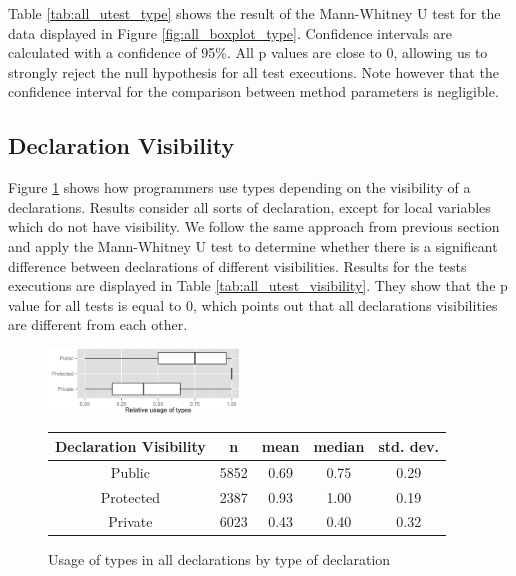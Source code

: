 \documentclass[preprint]{sigplanconf}
\renewcommand{\arraystretch}{1.2}
\begin{document}
Table \ref{tab:all_utest_type} shows the result of the Mann-Whitney U test for the data displayed in Figure \ref{fig:all_boxplot_type}.
Confidence intervals are calculated with a confidence of 95\%.
All p values are close to 0, allowing us to strongly reject the null hypothesis for all test executions.
Note however that the confidence interval for the comparison between method parameters is negligible.


\subsection{Declaration Visibility\label{sub:res_all_visibility}}
Figure \ref{fig:all_boxplot_visibility_all} shows how programmers use types depending on the visibility of a declarations.
Results consider all sorts of declaration, except for local variables which do not have visibility. 
We follow the same approach from previous section and apply the Mann-Whitney U test to determine whether there is a significant difference between declarations of different visibilities.
Results for the tests executions are displayed in Table \ref{tab:all_utest_visibility}.
They show that the p value for all tests is equal to 0, which points out that all declarations visibilities are different from each other.

\begin{figure}[h]
\centering 
\includegraphics[width=0.45\textwidth]{../analysis/result/all/boxplots/23_declarations_by_visibility.png} 
\label{fig:all_boxplot_visibility_all} 

\vspace{0.3cm}

\renewcommand{\arraystretch}{1.2}
\small
\begin{tabular}{|c|c|c|c|c|}
\hline
Declaration Visibility	& n		& mean	& median	& std. dev.	\\
\hline
\hline
Public    				& 5852	& 0.69	& 0.75		& 0.29		\\ \hline
Protected 				& 2387	& 0.93	& 1.00		& 0.19		\\ \hline
Private   				& 6023	& 0.43	& 0.40		& 0.32		\\ \hline
\end{tabular}
\caption{Usage of types in all declarations by type of declaration}
\end{figure}
\end{document}
